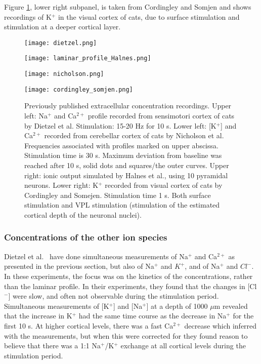 \documentclass{article}
\begin{document}
Figure \ref{fig:data sets}, lower right subpanel, is taken from Cordingley and Somjen \cite{CordingleySomjen} and shows recordings of K$^+$ in the visual cortex of cats, due to surface stimulation and stimulation at a deeper cortical layer. 
\begin{figure}[!tbp]
  \centering
  \begin{minipage}[b]{0.45\textwidth}
    \texttt{[image: dietzel.png]}
  \end{minipage}
  \hfill
  \begin{minipage}[b]{0.5\textwidth}
    \texttt{[image: laminar\_profile\_Halnes.png]}
  \end{minipage}
    \begin{minipage}[b]{0.45\textwidth}
    \texttt{[image: nicholson.png]}
  \end{minipage}
  \hfill
  \begin{minipage}[b]{0.5\textwidth}
    \texttt{[image: cordingley\_somjen.png]}
  \end{minipage}
  \caption{Previously published extracellular concentration recordings. Upper left: Na$^+$ and Ca$^{2+}$ profile recorded from sensimotori cortex of cats by Dietzel et al. Stimulation: 15-20 Hz for 10 s. Lower left: [K$^+$] and Ca$^{2+}$  recorded from cerebellar cortex of cats by Nicholson et al. Frequencies associated with profiles marked on upper abscissa. Stimulation time is 30 s. Maximum deviation from baseline was reached after 10 s, solid dots and squares/the outer curves. Upper right: ionic output simulated by Halnes et al., using 10 pyramidal neurons. Lower right: K$^+$ recorded from visual cortex of cats by Cordingley and Somejen. Stimulation time 1 s. Both surface stimulation and VPL stimulation (stimulation of the estimated cortical depth of the neuronal nuclei).
}
  \label{fig:data sets}
\end{figure} 



\subsubsection{Concentrations of the other ion species}
 Dietzel et al.\ \cite{Dietzel1982} have done simultaneous measurements of Na$^+$ and Ca$^{2+}$ as presented in the previous section, but also of Na$^+$ and $K^{+}$, and of Na$^+$ and $Cl^{-}$. In these experiments, the focus was on the kinetics of the concentrations, rather than the laminar profile. In their experiments, they found that the changes in [Cl$^-$] were slow, and often not observable during the stimulation period. Simultaneous measurements of [K$^+$] and [Na$^+$] at a depth of 1000 $\mu$m revealed that the increase in K$^+$ had the same time course as the decrease in Na$^+$ for the first 10 s. At higher cortical levels, there was a fast Ca$^{2+}$ decrease which inferred with the measurements, but when this were corrected for they found reason to believe that there was a 1:1 Na$^+$/K$^+$ exchange at all cortical levels during the stimulation period. 
 
\end{document}
